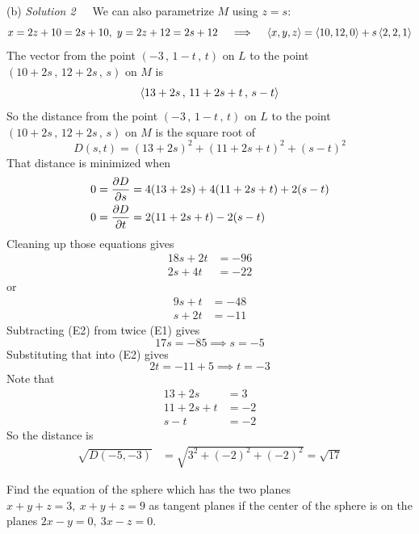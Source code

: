 \begin{solution}
(b) \emph{Solution 2}\ \ \ 
We can also parametrize $M$ using $z=s$:
\begin{equation*}
x=2z+10=2s+10,\ 
y=2z+12=2s+12\quad\implies\quad
\llt x,y,z\rgt = \llt 10,12,0\rgt +s \llt 2,2,1\rgt
\end{equation*}
The vector from the point  $(-3\,,\,1-t\,,\,t)$ on $L$
to the point $(10+2s\,,\,12+2s\,,\,s)$ on $M$ is
\begin{equation*}
\left< 13+2s \,,\, 11+2s+t \,,\, s-t \right>
\end{equation*}
So the distance from the point  $(-3\,,\,1-t\,,\,t)$ on $L$
to the point $(10+2s\,,\,12+2s\,,\,s)$ on $M$ is the square root of
\begin{equation*}
D(s,t) = (13+2s)^2 +(11+2s+t)^2 +(s-t)^2
\end{equation*}
That distance is minimized when
\begin{align*}
0 = \pdiff{D}{s} &=4(13+2s) +4(11+2s+t) +2(s-t) \\
0 = \pdiff{D}{t} &=2(11+2s+t) -2(s-t) 
\end{align*}
Cleaning up those equations gives
\begin{align*}
18s +2t &= -96 \\
2s  +4t &=-22
\end{align*}
or
\begin{align*}
9s +t &=-48 \tag{E1}\\
 s+2t &=-11 \tag{E2}
\end{align*}
Subtracting (E2) from twice (E1) gives
\begin{equation*}
17s = -85 \implies s=-5
\end{equation*}
Substituting that into (E2) gives
\begin{equation*}
2t= -11 +5 \implies t = -3
\end{equation*}
Note that
\begin{align*}
13+2s &= 3
\\
11+2s+t &= -2
\\
s-t &= -2
\end{align*}
So the distance is
\begin{align*}
\sqrt{D(-5,-3)}
&=\sqrt{3^2 + (-2)^2 + (-2)^2}
=\sqrt{17}       
\end{align*}
\end{solution}


\begin{question}
Find the equation of the sphere which has the two planes
$x+y+z=3,\ x+y+z=9$ as tangent planes if the center of the sphere is on
the planes $2x-y=0,\ 3x-z=0$.
\end{question}

